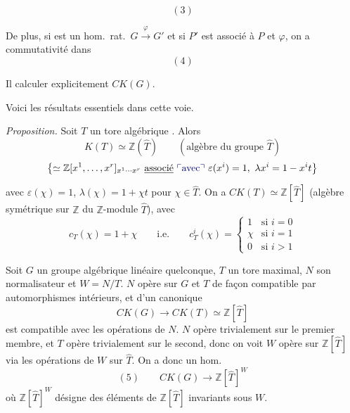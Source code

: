 \documentclass[11pt,a4paper]{article}
\begin{document}

\[ (3) \]


De plus, si \ill{} est un hom.\ rat.\ $G \xrightarrow{\ \varphi\ } G'$ et si $P'$
est associé à $P$ et $\varphi$, on a commutativité dans
\[ (4) \]


Il  \ill{} calculer explicitement $CK(G)$.

Voici les résultats essentiels dans cette voie.

\emph{Proposition.} Soit $T$ un tore algébrique . Alors
\[ K(T) \simeq \mathbb{Z}(\hat{T}) \qquad (\text{algèbre du groupe } \hat{T}) \]
\[ \bigl\{ \simeq \mathbb{Z}[x^{1}, \ldots, x^{r}]_{x^{1} \cdots x^{r}}
   \ \struck{\text{associé}}\ \add{\text{avec}}\ \varepsilon(x^{i}) = 1 ,
   \ \lambda x^{i} = 1 - x^{i} t \bigr\} \]
avec $\varepsilon(\chi) = 1$, $\lambda(\chi) = 1 + \chi t$ pour $\chi \in \hat{T}$.
On a $CK(T) \simeq \mathbb{Z}[\hat{T}]$ (algèbre symétrique sur $\mathbb{Z}$ du
$\mathbb{Z}$-module $\hat{T}$), avec
\[ c_{T}(\chi) = 1 + \chi \qquad \text{i.e.} \qquad
   c_{T}^{i}(\chi) = \begin{cases}
   1 & \text{si } i = 0 \\ \chi & \text{si } i = 1 \\ 0 & \text{si } i > 1
\end{cases} \]



Soit $G$ un groupe \struck{\ill{}} algébrique linéaire quelconque, $T$ un tore
maximal, $N$ son normalisateur et $W = N/T$. \struck{\ill{}} $N$ opère sur $G$ et
$T$ de façon compatible par automorphismes intérieurs, et \ill{} d'un \ill{}
canonique
\[ CK(G) \longrightarrow CK(T) \simeq \mathbb{Z}[\hat{T}] \]
est compatible avec les opérations de $N$. $N$ opère trivialement sur le premier
membre, et $T$ opère trivialement sur le second, donc on voit $W$ opère sur
$\mathbb{Z}[\hat{T}]$ via les opérations de $W$ sur $\hat{T}$. On a donc un hom.
\[ (5) \qquad CK(G) \longrightarrow \mathbb{Z}[\hat{T}]^{W} \]
où $\mathbb{Z}[\hat{T}]^{W}$ désigne   des
éléments de $\mathbb{Z}[\hat{T}]$ invariants sous $W$.
\end{document}
